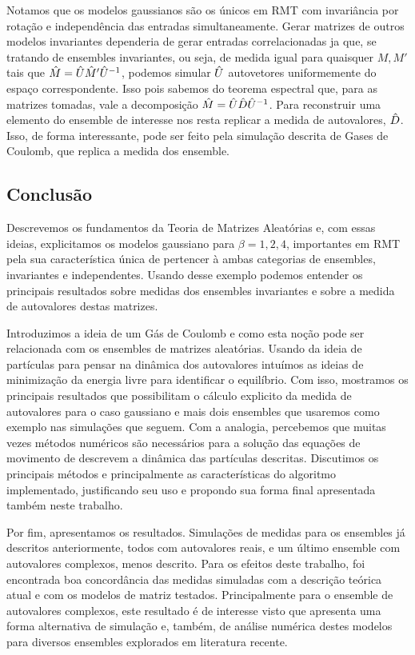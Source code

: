 \documentclass[12pt]{report}
\begin{document}
Notamos que os modelos gaussianos são os únicos em RMT com invariância por rotação e independência das entradas simultaneamente. Gerar matrizes de outros modelos invariantes dependeria de gerar entradas correlacionadas ja que, se tratando de ensembles invariantes, ou seja, de medida igual para quaisquer $M, M'$ tais que $\hat M = \hat U \hat M' \hat U^{-1}$, podemos simular $\hat U$ autovetores uniformemente do espaço correspondente. Isso pois sabemos do teorema espectral que, para as matrizes tomadas, vale a decomposição $\hat M = \hat U \hat D \hat U^{-1}$. Para reconstruir uma elemento do ensemble de interesse nos resta replicar a medida de autovalores, $\hat D$. Isso, de forma interessante, pode ser feito pela simulação descrita de Gases de Coulomb, que replica a medida dos ensemble.

\subsection{Conclusão}

Descrevemos os fundamentos da Teoria de Matrizes Aleatórias e, com essas ideias, explicitamos os modelos gaussiano para $\beta = 1,2,4$, importantes em RMT pela sua característica única de pertencer à ambas categorias de ensembles, invariantes e independentes. Usando desse exemplo podemos entender os principais resultados sobre medidas dos ensembles invariantes e sobre a medida de autovalores destas matrizes. 

Introduzimos a ideia de um Gás de Coulomb e como esta noção pode ser relacionada com os ensembles de matrizes aleatórias. Usando da ideia de partículas para pensar na dinâmica dos autovalores intuímos as ideias de minimização da energia livre para identificar o equilíbrio. Com isso, mostramos os principais resultados que possibilitam o cálculo explicito da medida de autovalores para o caso gaussiano e mais dois ensembles que usaremos como exemplo nas simulações que seguem. Com a analogia, percebemos que muitas vezes métodos numéricos são necessários para a solução das equações de movimento de descrevem a dinâmica das partículas descritas. Discutimos os principais métodos e principalmente as características do algoritmo implementado, justificando seu uso e propondo sua forma final apresentada também neste trabalho.

Por fim, apresentamos os resultados. Simulações de medidas para os ensembles já descritos anteriormente, todos com autovalores reais, e um último ensemble com autovalores complexos, menos descrito. Para os efeitos deste trabalho, foi encontrada boa concordância das medidas simuladas com a descrição teórica atual e com os modelos de matriz testados. Principalmente para o ensemble de autovalores complexos, este resultado é de interesse visto que apresenta uma forma alternativa de simulação e, também, de análise numérica destes modelos para diversos ensembles explorados em literatura recente.
\end{document}
